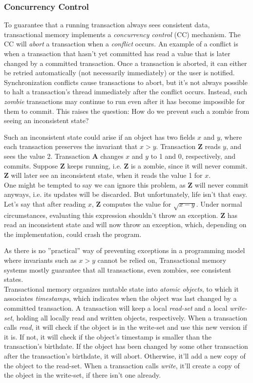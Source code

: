 \documentclass[main]{subfiles}
\begin{document}
\subsubsection{Concurrency Control}
To guarantee that a running transaction always sees consistent data, transactional memory implements a \textit{concurrency control} (CC) mechanism. The CC will \textit{abort} a transaction when a \textit{conflict} occurs. An example of a conflict is when a transaction that hasn't yet committed has read a value that is later changed by a committed transaction. Once a transaction is aborted, it can either be retried automatically (not necessarily immediately) or the user is notified. \\[3mm]
Synchronization conflicts cause transactions to abort, but it's not always possible to halt a transaction's thread immediately after the conflict occurs. Instead, such \textit{zombie} transactions may continue to run even after it has become impossible for them to commit. This raises the question: How do we prevent such a zombie from seeing an inconsistent state?
\begin{example}
    Such an inconsistent state could arise if an object has two fields $x$ and $y$, where each transaction preserves the invariant that $x > y$. Transaction \textbf{Z} reads $y$, and sees the value 2. Transaction \textbf{A} changes $x$ and $y$ to 1 and 0, respectively, and commits. Suppose \textbf{Z} keeps running, i.e. \textbf{Z} is a zombie, since it will never commit. \textbf{Z} will later see an inconsistent state, when it reads the value 1 for $x$.\\[3mm]
    One might be tempted to say we can ignore this problem, as \textbf{Z} will never commit anyways, i.e. its updates will be discarded. But unfortunately, life isn't that easy. Let's say that after reading $x$, \textbf{Z} computes the value for $\sqrt{x-y}$. Under normal circumstances, evaluating this expression shouldn't throw an exception. \textbf{Z} has read an inconsistent state and will now throw an exception, which, depending on the implementation, could crash the program.
\end{example}
As there is no ''practical'' way of preventing exceptions in a programming model where invariants such as $x > y$ cannot be relied on, Transactional memory systems mostly guarantee that all transactions, even zombies, see consistent states.\\[3mm]
Transactional memory organizes mutable state into \textit{atomic objects}, to which it associates \textit{timestamps}, which indicates when the object was last changed by a committed transaction. A transaction will keep a local \textit{read-set} and a local \textit{write-set}, holding all locally read and written objects, respectively. When a transaction calls \textit{read}, it will check if the object is in the write-set and use this new version if it is. If not, it will check if the object's timestamp is smaller than the transaction's birthdate. If the object has been changed by some other transaction after the transaction's birthdate, it will abort. Otherwise, it'll add a new copy of the object to the read-set. When a transaction calls \textit{write}, it'll create a copy of the object in the write-set, if there isn't one already.\\[3mm]
\end{document}
